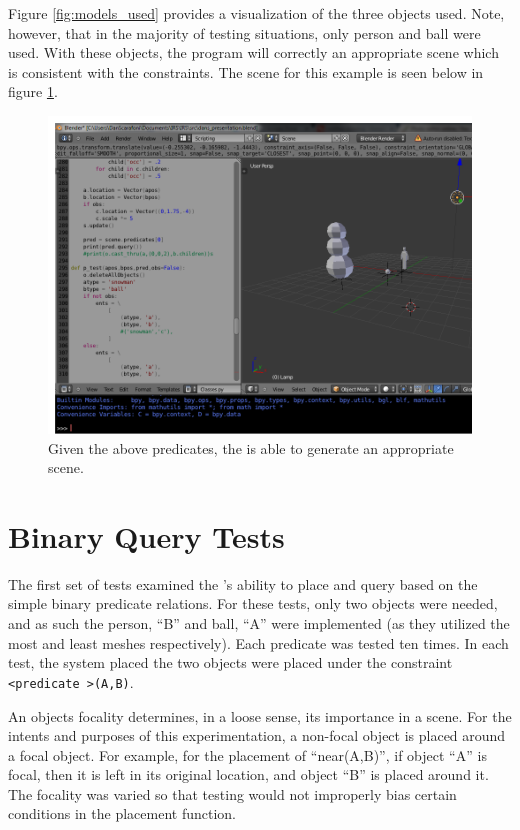 Figure \ref{fig:models_used} provides a visualization of the three objects used. Note, however, that in the majority of testing situations, only person and ball were used.
With these objects, the program will correctly an appropriate scene which is consistent with the constraints. 
The scene for this example is seen below in figure \ref{fig:scene_demo}.
\begin{figure}[h]
	\centering
		\includegraphics[width=1\textwidth]{figures/scene_demo.png}
	\caption{Given the above predicates, the \TDS
	 is able to generate an appropriate scene.}
	\label{fig:scene_demo}
\end{figure}

\section{Binary Query Tests}
The first set of tests examined the \TDS's ability to place and query based on the simple binary predicate relations. 
For these tests, only two objects were needed, and as such the person, ``B'' and ball, ``A'' were implemented (as they utilized the most and least meshes respectively).
Each predicate was tested ten times. 
In each test, the system placed the two objects were placed under the constraint \texttt{\textless predicate \textgreater (A,B)}.

An objects focality determines, in a loose sense, its importance in a scene. For the intents and purposes of this experimentation, a non-focal object is placed around a focal object. For example, for the placement of ``near(A,B)'', if object ``A'' is focal, then it is left in its original location, and object ``B'' is placed around it. The focality was varied so that testing would not improperly bias certain conditions in the placement function.

